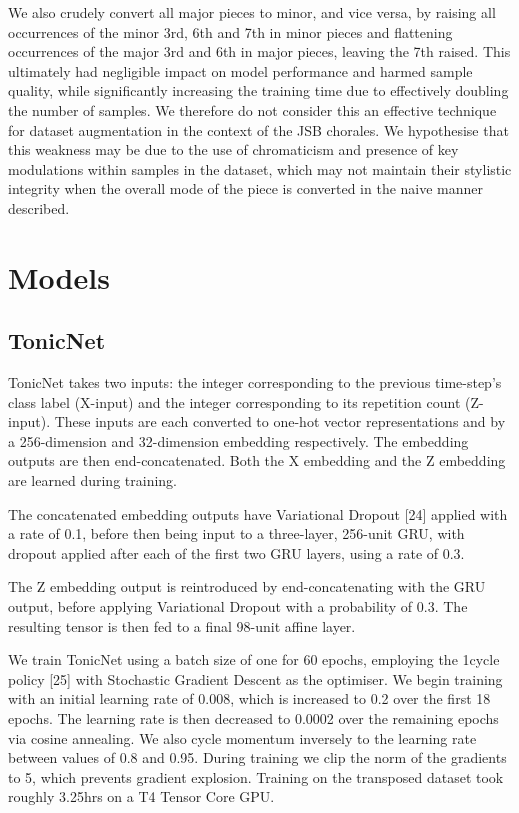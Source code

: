 \documentclass{article}
\begin{document}
We also crudely convert all major pieces to minor, and vice versa, by raising all occurrences of the minor 3rd, 6th and 7th in minor pieces and flattening occurrences of the major 3rd and 6th in major pieces, leaving the 7th raised. This ultimately had negligible impact on model performance and harmed sample quality, while significantly increasing the training time due to effectively doubling the number of samples. We therefore do not consider this an effective technique for dataset augmentation in the context of the JSB chorales. We hypothesise that this weakness may be due to the use of chromaticism and presence of key modulations within samples in the dataset, which may not maintain their stylistic integrity when the overall mode of the piece is converted in the naive manner described.

\section{Models}\label{sec:models}

\subsection{TonicNet}\label{subsec:tonicnet}

TonicNet takes two inputs: the integer corresponding to the previous time-step's class label (X-input) and the integer corresponding to its repetition count (Z-input). These inputs are each converted to one-hot vector representations and by a 256-dimension and 32-dimension embedding respectively. The embedding outputs are then end-concatenated. Both the X embedding and the Z embedding are learned during training.

The concatenated embedding outputs have Variational Dropout [24] applied with a rate of 0.1, before then being input to a three-layer, 256-unit GRU, with dropout applied after each of the first two GRU layers, using a rate of 0.3.

The Z embedding output is reintroduced by end-concatenating with the GRU output, before applying Variational Dropout with a probability of 0.3. The resulting tensor is then fed to a final 98-unit affine layer.

We train TonicNet using a batch size of one for 60 epochs, employing the 1cycle policy [25] with Stochastic Gradient Descent as the optimiser. We begin training with an initial learning rate of 0.008, which is increased to 0.2 over the first 18 epochs. The learning rate is then decreased to 0.0002 over the remaining epochs via cosine annealing. We also cycle momentum inversely to the learning rate between values of 0.8 and 0.95. During training we clip the norm of the gradients to 5, which prevents gradient explosion. Training on the transposed dataset took roughly 3.25hrs on a T4 Tensor Core GPU.
\end{document}
